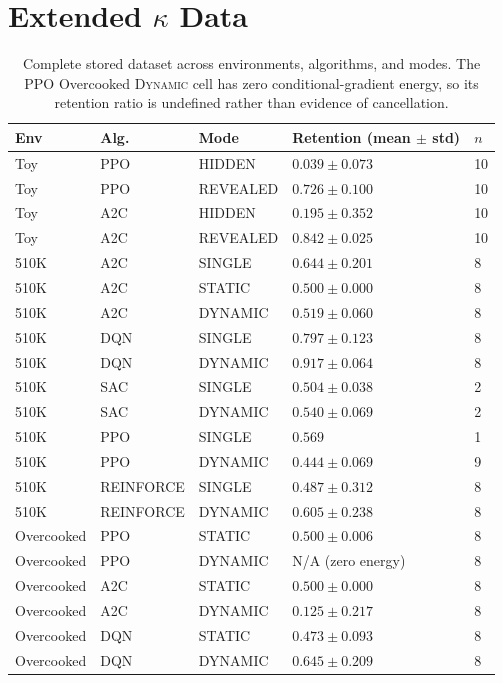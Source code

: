 \documentclass[letterpaper]{article}
\begin{document}
\section{Extended $\kappa$ Data}

\begin{table}[H]
\centering
\scriptsize
\setlength{\tabcolsep}{2pt}
\begin{tabular}{lllll}
\toprule
Env & Alg. & Mode & Retention (mean $\pm$ std) & $n$ \\
\midrule
Toy      & PPO & HIDDEN   & $0.039 \pm 0.073$ & 10 \\
Toy      & PPO & REVEALED & $0.726 \pm 0.100$ & 10 \\
Toy      & A2C & HIDDEN   & $0.195 \pm 0.352$ & 10 \\
Toy      & A2C & REVEALED & $0.842 \pm 0.025$ & 10 \\
510K     & A2C & SINGLE   & $0.644 \pm 0.201$ & 8 \\
510K     & A2C & STATIC   & $0.500 \pm 0.000$ & 8 \\
510K     & A2C & DYNAMIC  & $0.519 \pm 0.060$ & 8 \\
510K     & DQN & SINGLE   & $0.797 \pm 0.123$ & 8 \\
510K     & DQN & DYNAMIC  & $0.917 \pm 0.064$ & 8 \\
510K     & SAC & SINGLE   & $0.504 \pm 0.038$ & 2 \\
510K     & SAC & DYNAMIC  & $0.540 \pm 0.069$ & 2 \\
510K     & PPO & SINGLE   & $0.569$           & 1 \\
510K     & PPO & DYNAMIC  & $0.444 \pm 0.069$ & 9 \\
510K     & REINFORCE & SINGLE  & $0.487 \pm 0.312$ & 8 \\
510K     & REINFORCE & DYNAMIC & $0.605 \pm 0.238$ & 8 \\
Overcooked & PPO & STATIC  & $0.500 \pm 0.006$ & 8 \\
Overcooked & PPO & DYNAMIC & N/A (zero energy) & 8 \\
Overcooked & A2C & STATIC  & $0.500 \pm 0.000$ & 8 \\
Overcooked & A2C & DYNAMIC & $0.125 \pm 0.217$ & 8 \\
Overcooked & DQN & STATIC  & $0.473 \pm 0.093$ & 8 \\
Overcooked & DQN & DYNAMIC & $0.645 \pm 0.209$ & 8 \\
\bottomrule
\end{tabular}
\caption{Complete stored dataset across environments, algorithms, and modes.
The PPO Overcooked \textsc{Dynamic} cell has zero conditional-gradient
energy, so its retention ratio is undefined rather than evidence of
cancellation.}
\end{table}
\end{document}
